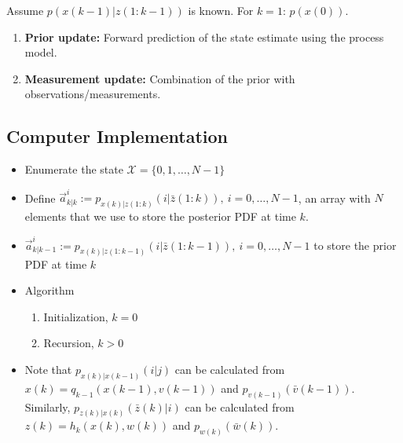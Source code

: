\documentclass[10pt,a4paper]{scrartcl}
\begin{document}
\begin{multicols*}{2}
Assume $p(x(k-1)|z(1:k-1))$ is known. For $k=1$: $p(x(0))$.

\begin{enumerate}
\item \textbf{Prior update:} Forward prediction of the state estimate using the process model.


\item \textbf{Measurement update:} Combination of the prior with observations/measurements.

\end{enumerate}

\subsection{Computer Implementation}

\begin{itemize}
\item Enumerate the state $\mathcal{X}=\{0,1,\ldots,N-1\}$
\item Define $\vec{a}_{k|k}^i:=p_{x(k)|z(1:k)}(i|\bar{z}(1:k)),\ i=0,\ldots,N-1$, an array with $N$ elements that we use to store the posterior PDF at time $k$.
\item $\vec{a}_{k|k-1}^i:=p_{x(k)|z(1:k-1)}(i|\bar{z}(1:k-1)),\ i=0,\ldots,N-1$ to store the prior PDF at time $k$
\item Algorithm
\begin{enumerate}
\item Initialization, $k=0$
\item Recursion, $k>0$
\end{enumerate}
\item Note that $p_{x(k)|x(k-1)}(i|j)$ can be calculated from $x(k)=q_{k-1}(x(k-1),v(k-1))$ and $p_{v(k-1)}(\bar{v}(k-1))$. Similarly, $p_{z(k)|x(k)}(\bar{z}(k)|i)$ can be calculated from $z(k)=h_k(x(k),w(k))$ and $p_{w(k)}(\bar{w}(k))$.
\end{itemize}


\end{multicols*}
\end{document}
